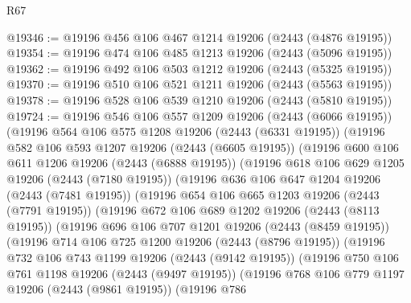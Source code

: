 \begin{lexlean}{R67}
\begin{coremodule}
@19346 := @19196 @456 @106 @467 @1214 @19206 (@2443 (@4876 @19195))
@19354 := @19196 @474 @106 @485 @1213 @19206 (@2443 (@5096 @19195))
@19362 := @19196 @492 @106 @503 @1212 @19206 (@2443 (@5325 @19195))
@19370 := @19196 @510 @106 @521 @1211 @19206 (@2443 (@5563 @19195))
@19378 := @19196 @528 @106 @539 @1210 @19206 (@2443 (@5810 @19195))
@19724 := @19196
    @546
    @106
    @557
    @1209
    @19206
    (@2443 (@6066 @19195))
    (@19196
      @564
      @106
      @575
      @1208
      @19206
      (@2443 (@6331 @19195))
      (@19196
        @582
        @106
        @593
        @1207
        @19206
        (@2443 (@6605 @19195))
        (@19196
          @600
          @106
          @611
          @1206
          @19206
          (@2443 (@6888 @19195))
          (@19196
            @618
            @106
            @629
            @1205
            @19206
            (@2443 (@7180 @19195))
            (@19196
              @636
              @106
              @647
              @1204
              @19206
              (@2443 (@7481 @19195))
              (@19196
                @654
                @106
                @665
                @1203
                @19206
                (@2443 (@7791 @19195))
                (@19196
                  @672
                  @106
                  @689
                  @1202
                  @19206
                  (@2443 (@8113 @19195))
                  (@19196
                    @696
                    @106
                    @707
                    @1201
                    @19206
                    (@2443 (@8459 @19195))
                    (@19196
                      @714
                      @106
                      @725
                      @1200
                      @19206
                      (@2443 (@8796 @19195))
                      (@19196
                        @732
                        @106
                        @743
                        @1199
                        @19206
                        (@2443 (@9142 @19195))
                        (@19196
                          @750
                          @106
                          @761
                          @1198
                          @19206
                          (@2443 (@9497 @19195))
                          (@19196
                            @768
                            @106
                            @779
                            @1197
                            @19206
                            (@2443 (@9861 @19195))
                            (@19196
                              @786

\end{coremodule}
\end{lexlean}
